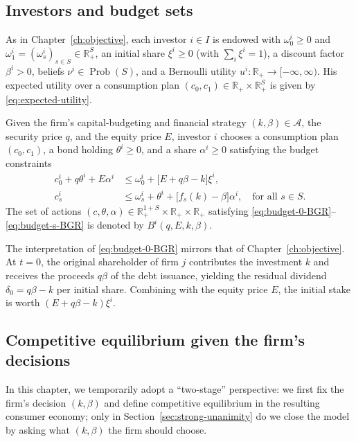 \documentclass[11pt,a4paper,oneside]{book}
\def\R{\mathbb{R}}
\def\leq{\leqslant}
\def\geq{\geqslant}
\DeclareMathOperator{\Prob}{Prob}
\theoremstyle{plain}
\theoremstyle{definition}
\theoremstyle{remark}
\numberwithin{equation}{chapter}
\begin{document}
\subsection{Investors and budget sets}

As in Chapter~\ref{ch:objective}, each investor $i \in I$ is endowed with $\omega^i_0 \geq 0$ and $\omega^i_1 = (\omega^i_s)_{s \in S} \in \R_+^S$, an initial share $\xi^i \geq 0$ (with $\sum_{i} \xi^i = 1$), a discount factor $\beta^i > 0$, beliefs $\nu^i \in \Prob(S)$, and a Bernoulli utility $u^i : \R_+ \to [-\infty, \infty)$.
His expected utility over a consumption plan $(c_0, c_1) \in \R_+ \times \R_+^S$ is given by \eqref{eq:expected-utility}.

Given the firm's capital-budgeting and financial strategy $(k, \beta) \in \mathcal{A}$, the security price $q$, and the equity price $E$, investor $i$ chooses a consumption plan $(c_0, c_1)$, a bond holding $\theta^i \geq 0$, and a share $\alpha^i \geq 0$ satisfying the budget constraints
\begin{align}
  c^i_0 + q \theta^i + E \alpha^i
  &\leq
  \omega^i_0 + \bigl[ E + q \beta - k \bigr] \xi^i,
  \label{eq:budget-0-BGR}\\[2pt]
  c^i_s
  &\leq
  \omega^i_s + \theta^i + \bigl[ f_s(k) - \beta \bigr] \alpha^i,
  \quad \text{for all $s\in S$}.
  \label{eq:budget-s-BGR}
\end{align}
The set of actions $(c, \theta, \alpha) \in \R_+^{1+S} \times \R_+ \times \R_+$ satisfying \eqref{eq:budget-0-BGR}--\eqref{eq:budget-s-BGR} is denoted by $B^i(q, E, k, \beta)$.

The interpretation of \eqref{eq:budget-0-BGR} mirrors that of Chapter~\ref{ch:objective}.
At $t=0$, the original shareholder of firm $j$ contributes the investment $k$ and receives the proceeds $q \beta$ of the debt issuance, yielding the residual dividend $\delta_0 = q \beta - k$ per initial share.
Combining with the equity price $E$, the initial stake is worth $(E + q \beta - k) \xi^i$.

\subsection{Competitive equilibrium given the firm's decisions}

In this chapter, we temporarily adopt a ``two-stage'' perspective: we first fix the firm's decision $(k, \beta)$ and define competitive equilibrium in the resulting consumer economy; only in Section~\ref{sec:strong-unanimity} do we close the model by asking what $(k, \beta)$ the firm should choose.
\end{document}
